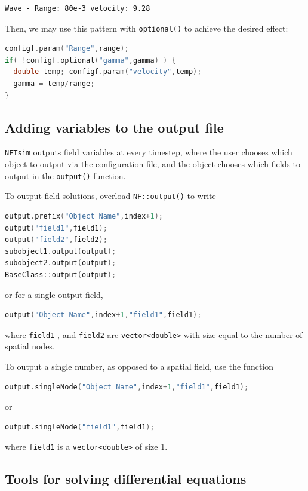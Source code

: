\documentclass[12pt,a4paper]{article}
\newcommand{\type}[1]{{\small\small\tt #1} }
\newcommand{\NF}[0]{\type{NFTsim}}
\begin{document}
\begin{lstlisting}
Wave - Range: 80e-3 velocity: 9.28
\end{lstlisting}

Then, we may use this pattern with \type{optional()} to achieve the desired effect:
\begin{lstlisting}[language=C++]
configf.param("Range",range);
if( !configf.optional("gamma",gamma) ) {
  double temp; configf.param("velocity",temp);
  gamma = temp/range;
}
\end{lstlisting}

\subsection{Adding variables to the output file}
\label{sec:output}

\NF outputs field variables at every timestep, where the user chooses which object to output via the configuration file, and the object chooses which fields to output in the \type{output()} function.

To output field solutions, overload \type{NF::output()} to write
\begin{lstlisting}[language=C++]
output.prefix("Object Name",index+1);
output("field1",field1);
output("field2",field2);
subobject1.output(output);
subobject2.output(output);
BaseClass::output(output);
\end{lstlisting}
or for a single output field,
\begin{lstlisting}[language=C++]
output("Object Name",index+1,"field1",field1);
\end{lstlisting}

where \type{field1}, and \type{field2} are \type{vector<double>} with size equal to the number of spatial nodes.

To output a single number, as opposed to a spatial field, use the function
\begin{lstlisting}[language=C++]
output.singleNode("Object Name",index+1,"field1",field1);
\end{lstlisting}
or
\begin{lstlisting}[language=C++]
output.singleNode("field1",field1);
\end{lstlisting}
where \type{field1} is a \type{vector<double>} of size 1.

\subsection{Tools for solving differential equations}
\label{sec:diffeqn}
\end{document}
